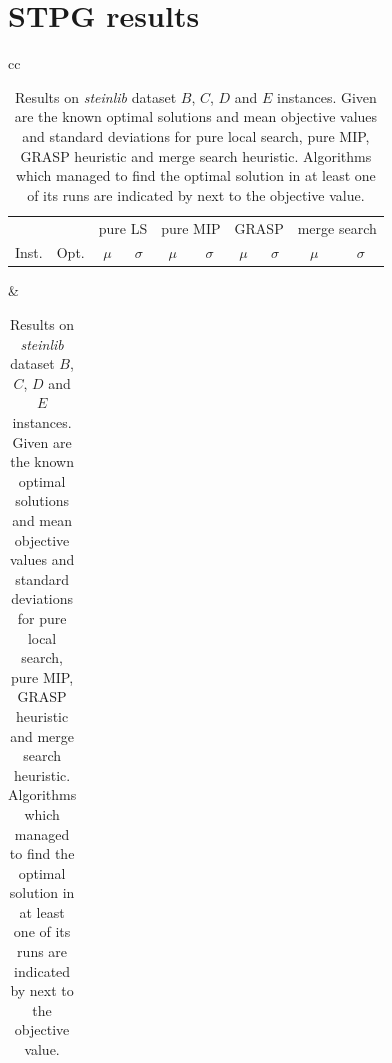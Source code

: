 \documentclass[journal]{IEEEtran}
\begin{document}
\section{STPG results}\label{app:stpg_results}
\begin{table}[h]
\centering
\caption[Results on \emph{steinlib} dataset \(B\) instances]{Results on \emph{steinlib} dataset \(B\), \(C\), \(D\) and \(E\) instances. Given are the known optimal solutions and mean objective values and standard deviations for pure local search, pure MIP, GRASP heuristic and merge search heuristic. Algorithms which managed to find the optimal solution in at least one of its runs are indicated by \opt{} next to the objective value.}\label{tab:stpg:results}
\begin{tabular}{cc}
\centering
\begin{adjustbox}{width=0.48\textwidth}
\begin{tabular}{lrrrrrrrrr} \toprule
 &  & \multicolumn{2}{c}{pure LS} & \multicolumn{2}{c}{pure MIP} & \multicolumn{2}{c}{GRASP} & \multicolumn{2}{c}{merge search}\\
\cmidrule(lr){3-4} \cmidrule(lr){5-6} \cmidrule(lr){7-8} \cmidrule(lr){9-10} 
Inst. & Opt. & \multicolumn{1}{c}{\(\mu\)}&\multicolumn{1}{c}{\(\sigma\)} & \multicolumn{1}{c}{\(\mu\)}&\multicolumn{1}{c}{\(\sigma\)}& \multicolumn{1}{c}{\(\mu\)}&\multicolumn{1}{c}{\(\sigma\)} & \multicolumn{1}{c}{\(\mu\)}&\multicolumn{1}{c}{\(\sigma\)}\\ \midrule
%

%
\bottomrule
\end{tabular}
\end{adjustbox}
&
\centering
\begin{adjustbox}{width=0.48\textwidth}
\begin{tabular}{lrrrrrrrrr} \toprule

\end{tabular}
\end{adjustbox}
\end{tabular}
\end{table}
\end{document}
